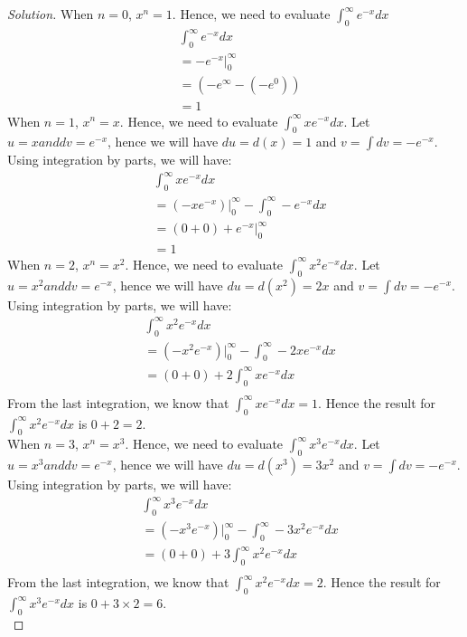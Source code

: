 \documentclass[12pt]{article}
\renewcommand\qedsymbol{$\blacksquare$}
\newenvironment{solution}
{\begin{proof}[Solution]\renewcommand\qedsymbol{$\square$}}
	{\end{proof}}
\begin{document}
\begin{enumerate}
	  \begin{solution}
	  	When $n=0$, $x^n = 1$. Hence, we need to evaluate $\int_0^\infty e^{-x} dx$
	  	\begin{align*}
		&\int_0^\infty e^{-x} dx\\
		&= -e^{-x} \bigg |^\infty_0\\
		&= ( -e^{\infty}-(-e^0)) \\
		&=1
	  	\end{align*}
  		When $n=1$, $x^n= x$. Hence, we need to evaluate $\int_0^\infty x e^{-x} dx$. Let $u=x and dv=e^{-x}$, hence we will have $du= d(x) = 1$ and $v = \int dv = -e^{-x} $. Using integration by parts, we will have:
  		\begin{align*}
  			&\int_0^\infty x e^{-x} dx\\
  			&= (-xe^{-x} ) \bigg |_0^\infty - \int^\infty_0 -e^{-x} dx \\
  			&=(0+0) + e^{-x} \bigg |^\infty_0\\
  			&=1
  		\end{align*}
  		When $n=2$, $x^n= x^2$. Hence, we need to evaluate $\int_0^\infty x^2 e^{-x} dx$. Let $u=x^2 and dv=e^{-x}$, hence we will have $du= d(x^2) = 2x$ and $v = \int dv = -e^{-x} $. Using integration by parts, we will have:
	  	\begin{align*}
	  		&\int_0^\infty x^2 e^{-x} dx\\
	  		&= (-x^2 e^{-x} ) \bigg |_0^\infty - \int^\infty_0 -2x e^{-x} dx\\
	  		&=(0+0) + 2 \int^\infty_0 x e^{-x} dx\\
	  	\end{align*}
	     From the last integration, we know that $\int^\infty_0 x e^{-x} dx = 1$. Hence the result for $\int_0^\infty x^2 e^{-x} dx$ is $0+2=2$.\\
			When $n=3$, $x^n= x^3$. Hence, we need to evaluate $\int_0^\infty x^3 e^{-x} dx$. Let $u=x^3 and dv=e^{-x}$, hence we will have $du= d(x^3) = 3x^2$ and $v = \int dv = -e^{-x} $. Using integration by parts, we will have:
		\begin{align*}
			&\int_0^\infty x^3 e^{-x} dx\\
			&= (-x^3 e^{-x} ) \bigg |_0^\infty - \int^\infty_0 -3x^2 e^{-x} dx \\
			&=(0+0) +  3 \int_0^\infty x^2 e^{-x} dx\\
		\end{align*}
	From the last integration, we know that $\int_0^\infty x^2 e^{-x} dx = 2$. Hence the result for $\int_0^\infty x^3 e^{-x} dx$ is $0+3 \times2=6$.\\


\end{solution}
\end{enumerate}
\end{document}
